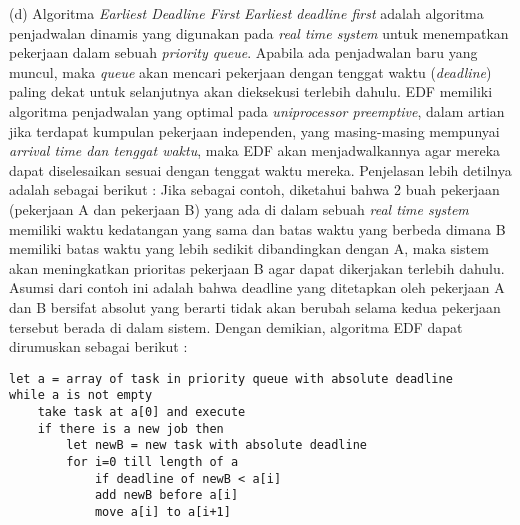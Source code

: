 \documentclass[a4paper,twoside]{article}
\begin{document}
\begin{enumerate}
		(d) Algoritma {\it Earliest Deadline First}\newline
		{\it Earliest deadline first} adalah algoritma penjadwalan dinamis yang digunakan pada {\it real time system} untuk menempatkan pekerjaan dalam sebuah {\it priority queue}. Apabila ada penjadwalan baru yang muncul, maka {\it queue} akan mencari pekerjaan dengan tenggat waktu ({\it deadline}) paling dekat untuk selanjutnya akan dieksekusi terlebih dahulu. \newline
		EDF memiliki algoritma penjadwalan yang optimal pada {\it uniprocessor preemptive}, dalam artian jika terdapat kumpulan pekerjaan independen, yang masing-masing mempunyai {\it arrival time dan tenggat waktu}, maka EDF akan menjadwalkannya agar mereka dapat diselesaikan sesuai dengan tenggat waktu mereka. Penjelasan lebih detilnya adalah sebagai berikut :\newline
		Jika sebagai contoh, diketahui bahwa 2 buah pekerjaan (pekerjaan A dan pekerjaan B) yang ada di dalam sebuah {\it real time system} memiliki waktu kedatangan yang sama dan batas waktu yang berbeda dimana B memiliki batas waktu yang lebih sedikit dibandingkan dengan A, maka sistem akan meningkatkan prioritas pekerjaan B agar dapat dikerjakan terlebih dahulu. Asumsi dari contoh ini adalah bahwa deadline yang ditetapkan oleh pekerjaan A dan B bersifat absolut yang berarti tidak akan berubah selama kedua pekerjaan tersebut berada di dalam sistem.\newline
		Dengan demikian, algoritma EDF dapat dirumuskan sebagai berikut :\newline
		\begin{lstlisting}
let a = array of task in priority queue with absolute deadline
while a is not empty
    take task at a[0] and execute
    if there is a new job then
        let newB = new task with absolute deadline
        for i=0 till length of a
            if deadline of newB < a[i]
            add newB before a[i]
            move a[i] to a[i+1] 
		\end{lstlisting}
		
		\newpage
		

\end{enumerate}
\end{document}
